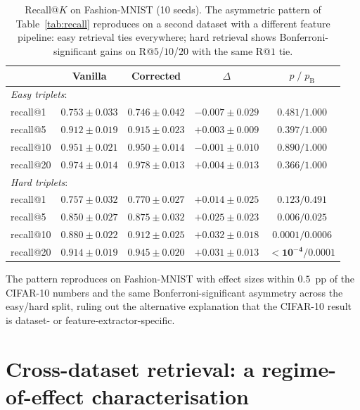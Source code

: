 \documentclass{article}
\begin{document}
\begin{table}[!htbp]
\centering
\small
\caption{Recall@$K$ on Fashion-MNIST (10 seeds). The asymmetric pattern
of Table~\ref{tab:recall} reproduces on a second dataset with a
different feature pipeline: easy retrieval ties everywhere; hard
retrieval shows Bonferroni-significant gains on R@$5$/$10$/$20$ with
the same R@$1$ tie.}
\label{tab:recall-fashion}
\begin{tabular}{lcccc}
\toprule
& Vanilla & Corrected & $\Delta$ & $p \;/\; p_{\text{B}}$ \\
\midrule
\multicolumn{5}{l}{\emph{Easy triplets}:} \\
recall@1  & $0.753 \pm 0.033$ & $0.746 \pm 0.042$ & $-0.007 \pm 0.029$ & $0.481 / 1.000$ \\
recall@5  & $0.912 \pm 0.019$ & $0.915 \pm 0.023$ & $+0.003 \pm 0.009$ & $0.397 / 1.000$ \\
recall@10 & $0.951 \pm 0.021$ & $0.950 \pm 0.014$ & $-0.001 \pm 0.010$ & $0.890 / 1.000$ \\
recall@20 & $0.974 \pm 0.014$ & $0.978 \pm 0.013$ & $+0.004 \pm 0.013$ & $0.366 / 1.000$ \\
\midrule
\multicolumn{5}{l}{\emph{Hard triplets}:} \\
recall@1  & $0.757 \pm 0.032$ & $0.770 \pm 0.027$ & $+0.014 \pm 0.025$ & $0.123 / 0.491$ \\
recall@5  & $0.850 \pm 0.027$ & $0.875 \pm 0.032$ & $\mathbf{+0.025 \pm 0.023}$ & $\mathbf{0.006 / 0.025}$ \\
recall@10 & $0.880 \pm 0.022$ & $0.912 \pm 0.025$ & $\mathbf{+0.032 \pm 0.018}$ & $\mathbf{0.0001 / 0.0006}$ \\
recall@20 & $0.914 \pm 0.019$ & $0.945 \pm 0.020$ & $\mathbf{+0.031 \pm 0.013}$ & $\mathbf{< 10^{-4} / 0.0001}$ \\
\bottomrule
\end{tabular}
\end{table}

The pattern reproduces on Fashion-MNIST with effect sizes within $0.5$~pp
of the CIFAR-10 numbers and the same Bonferroni-significant asymmetry
across the easy/hard split, ruling out the alternative explanation
that the CIFAR-10 result is dataset- or feature-extractor-specific.

\section{Cross-dataset retrieval: a regime-of-effect characterisation}
\label{app:multidataset}
\end{document}
